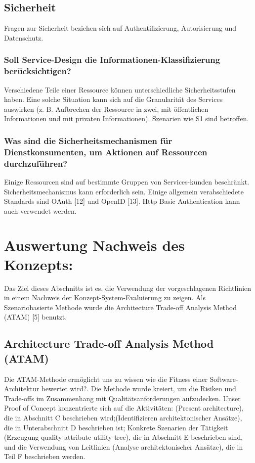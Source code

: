 \documentclass{acmsiggraph}
\begin{document}
\subsection{Sicherheit}
Fragen zur Sicherheit beziehen sich auf Authentifizierung, Autorisierung und Datenschutz.
\subsubsection{Soll Service-Design die Informationen-Klassifizierung berücksichtigen?}
Verschiedene Teile einer Ressource können unterschiedliche Sicherheitsstufen haben.
Eine solche Situation kann sich auf die Granularität des Services auswirken (z. B. Aufbrechen der Ressource in zwei, mit öffentlichen Informationen und mit privaten Informationen). Szenarien wie S1 sind betroffen.
\subsubsection{Was sind die Sicherheitsmechanismen für Dienstkonsumenten, um Aktionen auf Ressourcen durchzuführen?}
Einige Ressourcen sind auf bestimmte Gruppen von Services-kunden beschränkt.
Sicherheitsmechanismus kann erforderlich sein. Einige allgemein verabschiedete Standards sind OAuth [12] und OpenID [13]. Http Basic Authentication kann auch verwendet werden.

\section{Auswertung Nachweis des Konzepts:}
Das Ziel dieses Abschnitts ist es, die Verwendung der vorgeschlagenen Richtlinien in einem Nachweis der Konzept-System-Evaluierung zu zeigen.
Als Szenariobasierte Methode wurde die Architecture Trade-off Analysis Method (ATAM) [5] benutzt.
\subsection{Architecture Trade-off Analysis Method (ATAM)}
Die ATAM-Methode ermöglicht uns zu wissen wie die Fitness einer Software-Architektur bewertet wird?.
Die Methode wurde kreiert, um die Risiken und Trade-offs im Zusammenhang mit Qualitätsanforderungen aufzudecken.
Unser Proof of Concept konzentrierte sich auf die Aktivitäten: (Present architecture), die in Abschnitt C beschrieben wird;(Identifizieren architektonischer Ansätze), die in Unterabschnitt D beschrieben ist; Konkrete Szenarien der Tätigkeit (Erzeugung quality attribute utility tree), die in Abschnitt E beschrieben sind, und die Verwendung von Leitlinien (Analyse architektonischer Ansätze), die in Teil F beschrieben werden.
\end{document}
